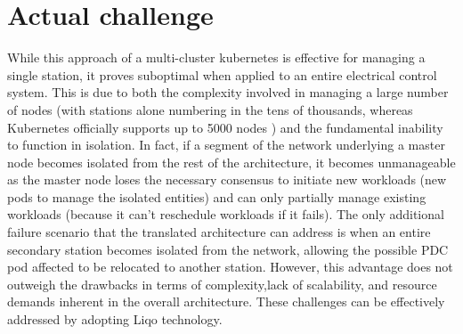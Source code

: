 \section{Actual challenge}
While this approach of a multi-cluster kubernetes is effective for managing a single station, it proves suboptimal when applied to an entire electrical control system. This is due to both the complexity involved in managing a large number of nodes (with stations alone numbering in the tens of thousands, whereas Kubernetes officially supports up to 5000 nodes \cite{a3-1}) and the fundamental inability to function in isolation. In fact, if a segment of the network underlying a master node becomes isolated from the rest of the architecture, it becomes unmanageable as the master node loses the necessary consensus to initiate new workloads (new pods to manage the isolated entities) and can only partially manage existing workloads (because it can't reschedule workloads if it fails).
The only additional failure scenario that the translated architecture can address is when an entire secondary station becomes isolated from the network, allowing the possible PDC pod affected to be relocated to another station. However, this advantage does not outweigh the drawbacks in terms of complexity,lack of scalability, and resource demands inherent in the overall architecture. These challenges can be effectively addressed by adopting Liqo technology.